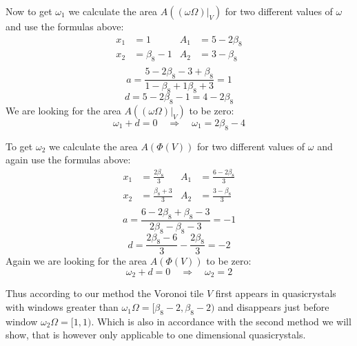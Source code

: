 \documentclass[text.tex]{subfiles}
\begin{document}
Now to get $\omega_1$ we calculate the area $A((\omega\Omega)|_V)$ for two different values of $\omega$ and use the formulas above: 
\begin{align*}
x_1&=1 & A_1&=5-2\beta_8 \\
x_2&=\beta_8-1 & A_2&=3-\beta_8 \\
\end{align*}
$$a = \frac{5-2\beta_8-3+\beta_8}{1-\beta_8+1\beta_8+3} = 1$$
$$d = 5-2\beta_8-1 = 4-2\beta_8$$
We are looking for the area $A((\omega\Omega)|_V)$ to be zero:
$$\omega_1+d=0\quad\Rightarrow\quad \omega_1 = 2\beta_8-4$$

To get $\omega_2$ we calculate the area $A(\Phi(V))$ for two different values of $\omega$ and again use the formulas above: 
\begin{align*}
x_1&=\frac{2\beta_8}{3} & A_1&=\frac{6-2\beta_8}{3} \\
x_2&=\frac{\beta_8+3}{3} & A_2&=\frac{3-\beta_8}{3} \\
\end{align*}
$$a = \frac{6-2\beta_8+\beta_8-3}{2\beta_8-\beta_8-3} = -1$$
$$d = \frac{2\beta_8-6}{3}-\frac{2\beta_8}{3} = -2$$
Again we are looking for the area $A(\Phi(V))$ to be zero:
$$\omega_2+d=0\quad\Rightarrow\quad \omega_2 = 2$$

Thus according to our method the Voronoi tile $V$ first appears in quasicrystals with windows greater than $\omega_1\Omega = [\beta_8-2, \beta_8-2)$ and disappears just before window $\omega_2\Omega = [1,1)$. Which is also in accordance with the second method we will show, that is however only applicable to one dimensional quasicrystals. 
\end{document}
